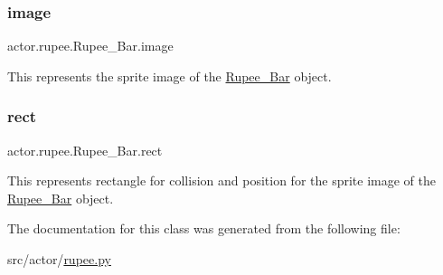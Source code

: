 \subsubsection{\texorpdfstring{image}{image}}
{\footnotesize\ttfamily actor.\+rupee.\+Rupee\+\_\+\+Bar.\+image}



This represents the sprite image of the \hyperlink{classactor_1_1rupee_1_1_rupee___bar}{Rupee\+\_\+\+Bar} object. 

\mbox{\label{classactor_1_1rupee_1_1_rupee___bar_ace89c66353c7b26fafa8a52a5fec2733}} 
\subsubsection{\texorpdfstring{rect}{rect}}
{\footnotesize\ttfamily actor.\+rupee.\+Rupee\+\_\+\+Bar.\+rect}



This represents rectangle for collision and position for the sprite image of the \hyperlink{classactor_1_1rupee_1_1_rupee___bar}{Rupee\+\_\+\+Bar} object. 



The documentation for this class was generated from the following file\+:\begin{DoxyCompactItemize}
\item 
src/actor/\hyperlink{rupee_8py}{rupee.\+py}\end{DoxyCompactItemize}
